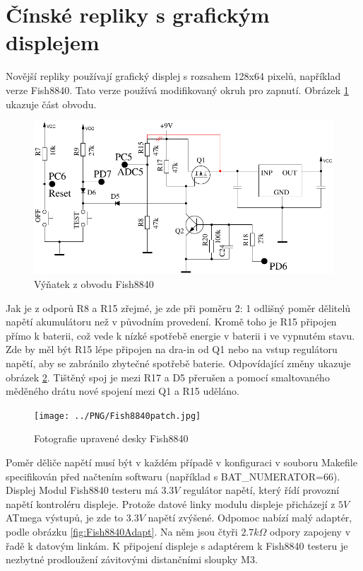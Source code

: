 \section{Čínské repliky s grafickým displejem}
Novější repliky používají grafický displej s rozsahem 128x64 pixelů, například verze Fish8840.
Tato verze používá modifikovaný okruh pro zapnutí. Obrázek \ref{fig:Fish8840} ukazuje část obvodu.

\begin{figure}[H]
\centering
\includegraphics[width=.7\textwidth]{../FIG/Fish8840.pdf}
\caption{Výňatek z obvodu Fish8840}
\label{fig:Fish8840}
\end{figure}

Jak je z odporů R8 a R15 zřejmé, je zde při poměru 2: 1 odlišný poměr dělitelů napětí akumulátoru
než v původním provedení.
Kromě toho je R15 připojen přímo k baterii, což vede k nízké spotřebě energie v baterii
i ve vypnutém stavu. Zde by měl být R15 lépe připojen na dra-in od Q1 nebo na vstup regulátoru napětí, aby
se zabránilo zbytečné spotřebě baterie.
Odpovídající změny ukazuje obrázek \ref{fig:Fish8840patch}. Tištěný spoj je mezi  R17 a D5 přerušen
a pomocí smaltovaného měděného drátu nové spojení mezi Q1 a R15 uděláno.

\begin{figure}[H]
\centering
\texttt{[image: ../PNG/Fish8840patch.jpg]}
\caption{Fotografie upravené desky Fish8840}
\label{fig:Fish8840patch}
\end{figure}

Poměr děliče napětí musí být v každém případě v konfiguraci v souboru Makefile specifikován 
před načtením softwaru (například s BAT\_NUMERATOR=66).
Displej Modul Fish8840 testeru má \(3.3V\) regulátor napětí, který řídí provozní napětí kontroléru
displeje.
Protože datové linky modulu displeje přicházejí z \(5V\) ATmega výstupů, je zde to \(3.3V\) napětí
zvýšené.
Odpomoc nabízí malý adaptér, podle obrázku \ref{fig:Fish8840Adapt}. Na něm jsou čtyři \(2.7k\Omega\)
odpory zapojeny v řadě k datovým linkám.
K připojení displeje s adaptérem k Fish8840 testeru je nezbytné prodloužení závitovými distančními sloupky M3.

